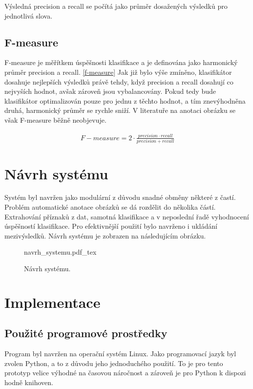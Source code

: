 \documentclass[czech,BP]{thesiskiv}
\begin{document}
\par Výsledná precision a recall se počítá jako průměr dosažených výsledků pro jednotlivá slova. 

\section{F-measure}
F-measure je měřítkem úspěšnosti klasifikace a je definována jako harmonický průměr precision a recall. \eqref{f-measure} Jak již bylo výše zmíněno, klasifikátor dosahuje nejlepších výsledků právě tehdy, když precision a recall dosahují co nejvyších hodnot, avšak zároveň jsou vybalancovány. Pokud tedy bude klasifikátor optimalizován pouze pro jednu z těchto hodnot, a tím znevýhodněna druhá, harmonický průměr se rychle sniží. V literatuře na anotaci obrázku se však F-measure běžně neobjevuje.

\begin{align}
   \label{f-measure} F-measure = 2 \cdot \frac{precision \cdot recall}{precision + recall}
\end{align}


\chapter{Návrh systému}
Systém byl navržen jako modulární z důvodu snadné obměny některé z častí. Problém automatické anotace obrázků se dá rozdělit do několika částí. Extrahování příznaků z dat, samotná klasifikace a v neposlední řadě vyhodnocení úspěšností klasifikace. Pro efektivnější použití bylo navrženo i ukládání mezivýsledků. Návrh systému je zobrazen na následujícím obrázku.


\begin{figure}[ht]
    \centering
    \label{navrh_systemu}
    \def\svgwidth{\columnwidth}
    {navrh_systemu.pdf_tex} 
    \caption{Návrh systému.}
\end{figure}


\chapter{Implementace}
\section{Použité programové prostředky}
\par Program byl navržen na operační systém Linux. Jako programovací jazyk byl zvolen Python, a to z důvodu jeho jednoduchého použití. To je pro tento prototyp velice výhodné na časovou náročnost a zároveň je pro Python k dispozi hodně knihoven. 
\end{document}
